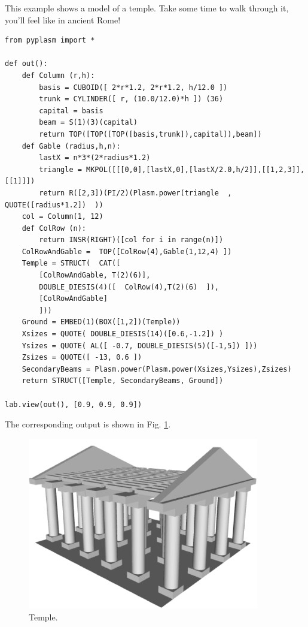 \documentclass{article}
\begin{document}
This example shows a model of a temple. Take some 
time to walk through it, you'll feel like in ancient Rome!
{\small
\begin{verbatim}
from pyplasm import *

def out():
    def Column (r,h):
        basis = CUBOID([ 2*r*1.2, 2*r*1.2, h/12.0 ]) 
        trunk = CYLINDER([ r, (10.0/12.0)*h ]) (36)
        capital = basis
        beam = S(1)(3)(capital) 
        return TOP([TOP([TOP([basis,trunk]),capital]),beam])
    def Gable (radius,h,n): 
        lastX = n*3*(2*radius*1.2)
        triangle = MKPOL([[[0,0],[lastX,0],[lastX/2.0,h/2]],[[1,2,3]],[[1]]])
        return R([2,3])(PI/2)(Plasm.power(triangle  , QUOTE([radius*1.2])  ))
    col = Column(1, 12)
    def ColRow (n): 
        return INSR(RIGHT)([col for i in range(n)])
    ColRowAndGable =  TOP([ColRow(4),Gable(1,12,4) ])
    Temple = STRUCT(  CAT([
        [ColRowAndGable, T(2)(6)], 
        DOUBLE_DIESIS(4)([  ColRow(4),T(2)(6)  ]), 
        [ColRowAndGable] 
        ]))
    Ground = EMBED(1)(BOX([1,2])(Temple))
    Xsizes = QUOTE( DOUBLE_DIESIS(14)([0.6,-1.2]) )
    Ysizes = QUOTE( AL([ -0.7, DOUBLE_DIESIS(5)([-1,5]) ]))
    Zsizes = QUOTE([ -13, 0.6 ])
    SecondaryBeams = Plasm.power(Plasm.power(Xsizes,Ysizes),Zsizes)
    return STRUCT([Temple, SecondaryBeams, Ground])

lab.view(out(), [0.9, 0.9, 0.9])
\end{verbatim}
}
\noindent
The corresponding output is shown in Fig. \ref{fig:temple}.

\begin{figure}[!ht]
\begin{center}
\includegraphics[width=0.9\textwidth]{img/temple.png}
\end{center}
\vspace{-2mm}
\caption{Temple.}
\label{fig:temple}
\end{figure}
\noindent
\newpage
\end{document}

